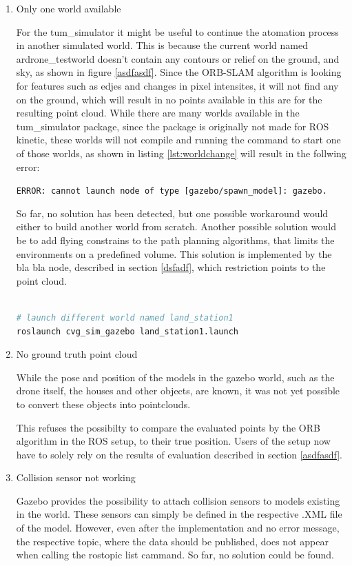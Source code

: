 	\begin{enumerate}
	
	\item{Only one world available}
	
	For the tum\_simulator it might be useful to continue the atomation process in another simulated world. This is because the current world named ardrone\_testworld
	doesn't contain any contours or relief on the ground, and sky, as shown in figure \ref{asdfasdf}. Since the ORB-SLAM algorithm is looking for features such as edjes and changes in pixel intensites, 
	it will not find any on the ground, which will result in no points available in this are for the resulting point cloud. While there are many worlds available in the 
	tum\_simulator package, since the package is originally not made for ROS kinetic, these worlds will not compile and running the command to start one of those worlds, 
	as shown in listing \ref{lst:worldchange} will result in the follwing error: 
	
	\texttt{ERROR: cannot launch node of type [gazebo/spawn\_model]: gazebo.}
	
	So far, no solution has been detected, but one possible workaround would either to build another world from scratch. Another possible solution would be to add flying 
	constrains to the path planning algorithms, that limits the environments on a predefined volume. This solution is implemented by the bla bla node, described in section 
	\ref{dsfadf}, which restriction points to the point cloud. 
	
	
\begin{lstlisting}[language=bash, caption= Launching different world, label=lst:worldchange]
	
# launch different world named land_station1
roslaunch cvg_sim_gazebo land_station1.launch

\end{lstlisting}

	\item{No ground truth point cloud}
	
	While the pose and position of the models in the gazebo world, such as the drone itself, the houses and other objects, are known, it was not yet possible 
	to convert these objects into pointclouds. 
	
	This refuses the possibilty to compare the evaluated points by the ORB algorithm in the ROS setup, to their true position. Users of the setup now have to solely
	rely on the results of evaluation described in section \ref{asdfasdf}.
	
	\item{Collision sensor not working}

	Gazebo provides the possibility to attach collision sensors to models existing in the world. These sensors can simply be defined in the respective 
	.XML file of the model. However, even after the implementation and no error message, the respective topic, where the data should be published, 
	does not appear when calling the rostopic list cammand. So far, no solution could be found. 

	\end{enumerate}